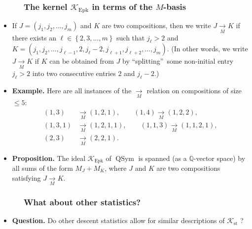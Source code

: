 \documentclass{beamer}
\newcommand{\Epk}{\operatorname{Epk}}
\newcommand{\st}{\operatorname{st}}
\newcommand{\calK}{\mathcal{K}}
\newcommand{\fti}[1]{\frametitle{\ \ \ \ \ #1}}
\newcommand{\defn}[1]{{\color{darkred}\emph{#1}}} %
\theoremstyle{plain}
\begin{document}
\begin{frame}
\fti{The kernel $\calK_{\Epk}$ in terms of the $M$-basis}

\begin{itemize}

\item If $J=\left(  j_{1},j_{2},\ldots,j_{m}\right)  $ and $K$
are two compositions, then we write \defn{$J\underset{M}{\rightarrow}K$} if
there exists an $\ell\in\left\{  2,3,\ldots,m\right\}  $ such that $j_{\ell
}>2$ and $K=\left(  j_{1},j_{2},\ldots,j_{\ell-1},2,j_{\ell}-2,j_{\ell
+1},j_{\ell+2},\ldots,j_{m}\right)  $. (In other words, we write
$J\underset{M}{\rightarrow}K$ if $K$ can be obtained from $J$ by
\textquotedblleft splitting\textquotedblright\ some non-initial entry
$j_{\ell}>2$ into
two consecutive entries $2$ and $j_{\ell}-2$.)

\item \textbf{Example.} Here are all instances of the $\underset{M}{\rightarrow}$ relation
on compositions of size $\leq 5$:
\begin{align*}
\left(  1,3\right)  &\underset{M}{\rightarrow}\left(  1,2,1\right)  ,\qquad
\left(  1,4\right)    \underset{M}{\rightarrow}\left(  1,2,2\right)  ,\\
\left(  1,3,1\right)   &  \underset{M}{\rightarrow}\left(  1,2,1,1\right)  ,\qquad
\left(  1,1,3\right)    \underset{M}{\rightarrow}\left(  1,1,2,1\right)  ,\\
\left(  2,3\right)   &  \underset{M}{\rightarrow}\left(  2,2,1\right)  .
\end{align*}

\item \textbf{Proposition.}
The ideal $\mathcal{K}_{\operatorname*{Epk}}$ of $\operatorname*{QSym}$ is
spanned (as a $\mathbb{Q}$-vector space) by all sums of the form $M_{J}+M_{K}%
$, where $J$ and $K$ are two compositions satisfying
$J\underset{M}{\rightarrow}K$.

\end{itemize}

\end{frame}

\begin{frame}
\fti{What about other statistics?}

\begin{itemize}

\item \textbf{Question.}
      Do other descent statistics allow for similar descriptions of
      $\calK_{\st}$ ?

\end{itemize}

\end{frame}
\end{document}
